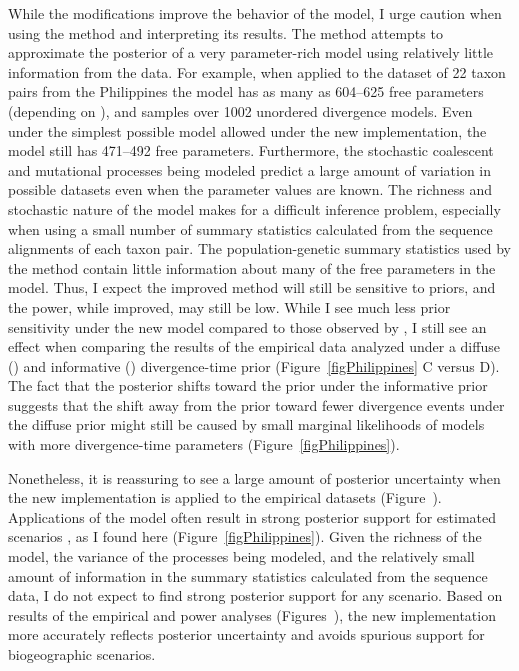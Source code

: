 While the modifications improve the behavior of the model, I urge caution when
using the method and interpreting its results.
The method attempts to approximate the posterior of a very parameter-rich model
using relatively little information from the data.
For example, when applied to the dataset of 22 taxon pairs from the Philippines
\citep{Oaks2012} the model has as many as 604--625 free parameters
(depending on \divTimeNum), and samples over 1002 unordered divergence models.
Even under the simplest possible model allowed under the new implementation,
the model still has 471--492 free parameters.
Furthermore, the stochastic coalescent and mutational processes being modeled
predict a large amount of variation in possible datasets even when the
parameter values are known.
The richness and stochastic nature of the model makes for a difficult inference
problem, especially when using a small number of summary statistics calculated
from the sequence alignments of each taxon pair.
The population-genetic summary statistics used by the method contain little
information about many of the free parameters in the model.
Thus, I expect the improved method will still be sensitive to priors, and the
power, while improved, may still be low.
While I see much less prior sensitivity under the new model compared to those
observed by \citet{Oaks2012}, I still see an effect when comparing the results
of the empirical data analyzed under a diffuse (\empModelDPP) and informative
(\empModelDPPInform) divergence-time prior (Figure~\ref{figPhilippines} C
versus D).
The fact that the posterior shifts toward the prior under the informative prior
suggests that the shift away from the prior toward fewer divergence events
under the diffuse prior might still be caused by small marginal likelihoods
of models with more divergence-time parameters (Figure~\ref{figPhilippines}).

Nonetheless, it is reassuring to see a large amount of posterior uncertainty
when the new implementation is applied to the empirical datasets
(Figure~).
Applications of the \msb model often result in strong posterior support for
estimated scenarios
\citep{Barber2010,Bell2012,Carnaval2009,Chan2011,Hickerson2006,Leache2007,Plouviez2009,Stone2012,Voje2009,Oaks2012},
as I found here (Figure~\ref{figPhilippines}).
Given the richness of the model, the variance of the processes being modeled,
and the relatively small amount of information in the summary statistics
calculated from the sequence data, I do not expect to find strong posterior
support for any scenario.
Based on results of the empirical and power analyses
(Figures~),
the new implementation more accurately reflects posterior uncertainty and
avoids spurious support for biogeographic scenarios.

